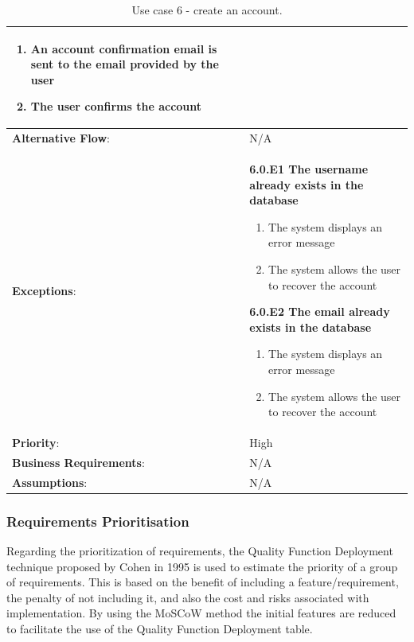 \begin{table}[H]
\begin{adjustbox}{width=1.2\textwidth,center=\textwidth}
\begin{tabular}{|m{4cm}|m{12cm}|}
\begin{enumerate}
                \item An account confirmation email is sent to the email provided by the user
                \item The user confirms the account
            \end{enumerate} \\
            \hline
            \textbf{Alternative Flow}: & N/A \\
            \hline
            \textbf{Exceptions}: & \textbf{6.0.E1  The username already exists in the database}
            \begin{enumerate}
                \item The system displays an error message
                \item The system allows the user to recover the account
            \end{enumerate}
            \textbf{6.0.E2 The email already exists in the database}
            \begin{enumerate}
                \item The system displays an error message
                \item The system allows the user to recover the account
            \end{enumerate} \\
            \hline
            \textbf{Priority}: & High \\
            \hline
            \textbf{Business Requirements}: & N/A \\
            \hline
            \textbf{Assumptions}: & N/A \\
            \hline
        \end{tabular}
    \end{adjustbox}
    \vspace{1em}
    \caption{Use case 6 - create an account.}
    \label{table:use_case6}
\end{table}

\subsubsection{Requirements Prioritisation}

Regarding the prioritization of requirements, the Quality Function Deployment technique
proposed by Cohen in 1995 \cite{cohen1995quality} is used to estimate the priority of a group of requirements.
This is based on the benefit of including a feature/requirement, the penalty of not including
it, and also the cost and risks associated with implementation. By using the MoSCoW method \cite{clegg1994case} the
initial features are reduced to facilitate the use of the Quality Function Deployment table.

